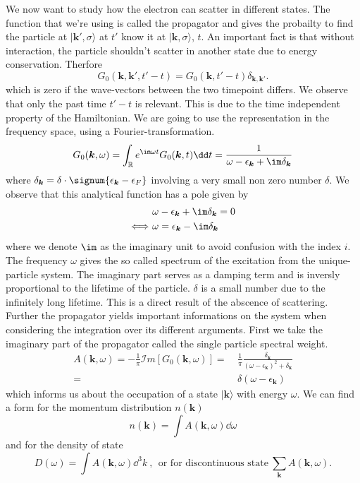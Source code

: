 \documentclass[../main.tex]{subfile}
\begin{document}
We now want to study how the electron can scatter in different states. The function that we're using is called the propagator and
gives the probailty to find the particle at $|\bm{k}',\sigma\rangle$ at $t'$ know it at  $|\bm{k},\sigma\rangle$, $t$. 
An important fact is that without interaction, the particle shouldn't scatter in another state due to energy conservation. Therfore
\[
    G_0(\bm{k}, \bm{k}', t'-t) = G_0(\bm{k}, t'-t) \delta_{\bm{k}, \bm{k}'}.
\]
which is zero if the wave-vectors between the two timepoint differs. 
We observe that only the past time $t'-t$ is relevant. This is due to the time independent property of the Hamiltonian.
We are going to use the representation in the frequency space, using a Fourier-transformation.
\begin{equation}
    G_0(\bm{k},\omega) = \int_{\mathbb{R}} e^{\im\omega t} G_0(\bm{k},t)\dd t = \frac{1}{\omega - \epsilon_{\bm{k}} + \im \delta_{\bm{k}}} \label{eq:single_propa}
\end{equation}
where $\delta_{\bm{k}} = \delta \cdot\signum{\epsilon_{\bm{k}} - \epsilon_{F}}$ involving a very small non zero number $\delta$. We observe that
this analytical function has a pole given by 
\begin{align*}
    &\omega - \epsilon_{\bm{k}} + \im \delta_{\bm{k}} = 0\\
    \Longleftrightarrow ~& \omega = \epsilon_{\bm{k}} - \im \delta_{\bm{k}}
\end{align*}
where we denote $\im$ as the imaginary unit to avoid confusion with the index $i$.
The frequency $\omega$ gives the so called spectrum of the excitation from the unique-particle system. The imaginary part serves as a damping term and is 
inversly proportional to the lifetime of the particle. $\delta$ is a small number due to the infinitely long lifetime. This is a direct result of the abscence
of scattering.\\

Further the propagator yields important informations on the system when considering the integration over its different arguments. First we take the imaginary 
part of the propagator called the single particle spectral weight.
\begin{equation}\label{eq:SingleParticleSpectralWeight}
    \begin{aligned}
        A(\bm{k}, \omega) = -\frac{1}{\pi} \mathcal{I}m \left[G_0(\bm{k}, \omega)\right] =~& \frac{1}{\pi} \frac{\delta_{\bm{k}}}{(\omega- \epsilon_{\bm{k}})^2 + \delta_{\bm{k}}}\\
        =~&\delta(\omega- \epsilon_{\bm{k}})
    \end{aligned}
\end{equation}
which informs us about the occupation of a state $|\bm{k}\rangle$ with energy $\omega$. We can find a form for the momentum distribution $n(\bm{k})$
\[
    n(\bm{k}) = \int A(\bm{k},\omega) \dd \omega
\]
and for the density of state
\begin{equation}\label{eq:DensityOfState}
    D(\omega) = \int A(\bm{k},\omega) \dd ^3 k~,~~ \text{or for discontinuous state}~ \sum_{\bm{k}} A(\bm{k}, \omega).
\end{equation}
\end{document}
